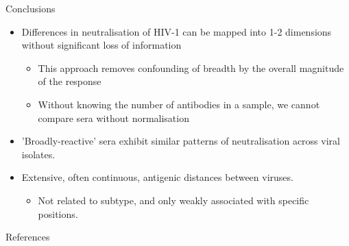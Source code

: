 \documentclass[final]{beamer}
\begin{document}
\begin{frame}{}
\begin{textblock}{40}
\begin{block}{Conclusions}
\begin{itemize}
\item{Differences in neutralisation of HIV-1 can be mapped into 1-2 dimensions without significant loss of information}
\begin{itemize}
\item{This approach removes confounding of breadth by the overall magnitude of the response}
 \item{Without knowing the number of antibodies in a sample, we cannot compare sera without normalisation}
 \end{itemize}
 \item{'Broadly-reactive' sera exhibit similar patterns of neutralisation across viral isolates.}
 \item{Extensive, often continuous, antigenic distances between viruses.}
 \begin{itemize}
 \item{Not related to subtype, and only weakly associated with specific positions.}
 \end{itemize}
\end{itemize}
\end{block}


\begin{block}{References}
\printbibliography[category=refs,heading=none]
\end{block}

\end{textblock}

\end{frame}
\end{document}
